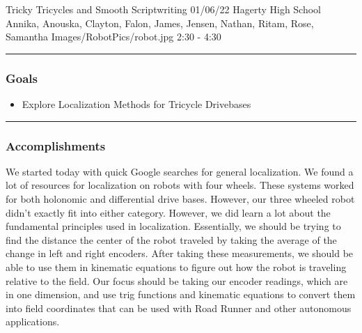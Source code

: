 \insertmeeting 
	{Tricky Tricycles and Smooth Scriptwriting} 
	{01/06/22} 
	{Hagerty High School}
	{Annika, Anouska, Clayton, Falon, James, Jensen, Nathan, Ritam, Rose, Samantha}
	{Images/RobotPics/robot.jpg}
	{2:30 - 4:30}
	
\noindent\hfil\rule{\textwidth}{.4pt}\hfil
\subsubsection*{Goals}
\begin{itemize}
    \item Explore Localization Methods for Tricycle Drivebases

\end{itemize} 

\noindent\hfil\rule{\textwidth}{.4pt}\hfil

\subsubsection*{Accomplishments}
We started today with quick Google searches for general localization. We found a lot of resources for localization on robots with four wheels. These systems worked for both holonomic and differential drive bases. However, our three wheeled robot didn't exactly fit into either category. However, we did learn a lot about the fundamental principles used in localization. Essentially, we should be trying to find the distance the center of the robot traveled by taking the average of the change in left and right encoders. After taking these measurements, we should be able to use them in kinematic equations to figure out how the robot is traveling relative to the field. Our focus should be taking our encoder readings, which are in one dimension, and use trig functions and kinematic equations to convert them into field coordinates that can be used with Road Runner and other autonomous applications. 
 

